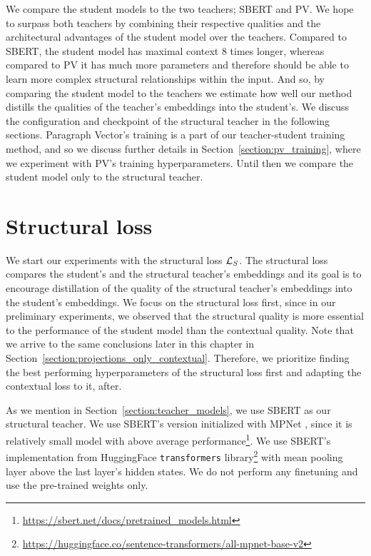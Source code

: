 We compare the student models to the two teachers; SBERT and PV. We hope to
surpass both teachers by combining their respective qualities and the
architectural advantages of the student model over the teachers. Compared to
SBERT, the student model has maximal context 8 times longer, whereas compared
to PV it has much more parameters and therefore should be able to learn more
complex structural relationships within the input. And so, by comparing the
student model to the teachers we estimate how well our method distills the
qualities of the teacher's embeddings into the student's. We discuss the
configuration and checkpoint of the structural teacher in the following
sections. Paragraph Vector's training is a part of our teacher-student training
method, and so we discuss further details in Section~\ref{section:pv_training},
where we experiment with PV's training hyperparameters. Until then we compare
the student model only to the structural teacher.

\section{Structural loss}\label{section:structural_loss}

We start our experiments with the structural loss $\mathcal{L}_S$. The structural
loss compares the student's and the structural teacher's embeddings and its
goal is to encourage distillation of the quality of the structural teacher's
embeddings into the student's embeddings. We focus on the structural loss first,
since in our preliminary experiments, we observed that the structural quality
is more essential to the performance of the student model than the contextual
quality. Note that we arrive to the same conclusions later in this chapter in
Section~\ref{section:projections_only_contextual}. Therefore, we prioritize
finding the best performing hyperparameters of the structural loss first and
adapting the contextual loss to it, after.

As we mention in Section~\ref{section:teacher_models}, we use SBERT
\citep{reimers2019sentence} as our structural teacher. We use SBERT's version
initialized with MPNet \citep{song2020mpnet}, since it is relatively small
model with above average
performance\footnote{\url{https://sbert.net/docs/pretrained_models.html}}. We
use SBERT's implementation from HuggingFace \texttt{transformers}
library\footnote{\url{https://huggingface.co/sentence-transformers/all-mpnet-base-v2}}
with mean pooling layer above the last layer's hidden states. We do not perform
any finetuning and use the pre-trained weights only.

